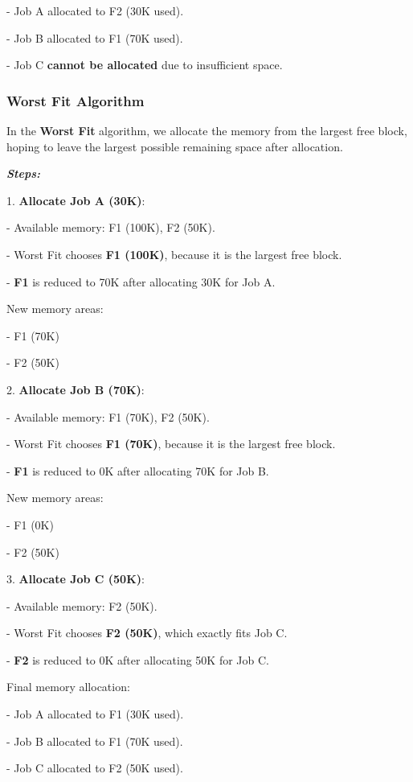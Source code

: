 \documentclass[a4paper]{book}
\begin{document}
   - Job A allocated to F2 (30K used).
   
   - Job B allocated to F1 (70K used).
   
   - Job C \textbf{cannot be allocated} due to insufficient space.

\subsubsection{Worst Fit Algorithm}

In the \textbf{Worst Fit} algorithm, we allocate the memory from the largest free block, hoping to leave the largest possible remaining space after allocation.

\textit{\textbf{Steps:}}

1. \textbf{Allocate Job A (30K)}:

   - Available memory: F1 (100K), F2 (50K).
   
   - Worst Fit chooses \textbf{F1 (100K)}, because it is the largest free block.
   
   - \textbf{F1} is reduced to 70K after allocating 30K for Job A.

   New memory areas:
   
   - F1 (70K)
   
   - F2 (50K)

2. \textbf{Allocate Job B (70K)}:

   - Available memory: F1 (70K), F2 (50K).
   
   - Worst Fit chooses \textbf{F1 (70K)}, because it is the largest free block.
   
   - \textbf{F1} is reduced to 0K after allocating 70K for Job B.

   New memory areas:
   
   - F1 (0K)
   
   - F2 (50K)

3. \textbf{Allocate Job C (50K)}:

   - Available memory: F2 (50K).
   
   - Worst Fit chooses \textbf{F2 (50K)}, which exactly fits Job C.
   
   - \textbf{F2} is reduced to 0K after allocating 50K for Job C.

   Final memory allocation:
   
   - Job A allocated to F1 (30K used).
   
   - Job B allocated to F1 (70K used).
   
   - Job C allocated to F2 (50K used).
\end{document}

